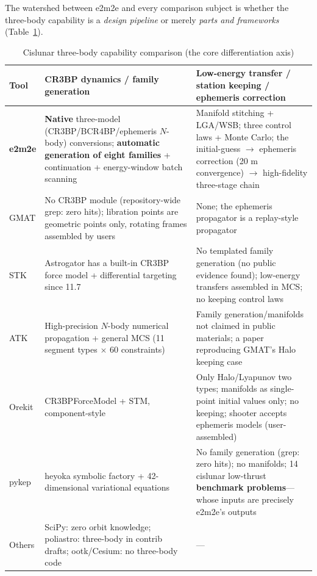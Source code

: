 The watershed between e2m2e and every comparison subject is whether the
three-body capability is a \emph{design pipeline} or merely \emph{parts and
frameworks} (Table~\ref{tab:threebody}).

\begin{table}[htbp]
\centering\small
\caption{Cislunar three-body capability comparison (the core differentiation
axis)}
\label{tab:threebody}
\begin{tabularx}{\textwidth}{@{}lXX@{}}
\toprule
\textbf{Tool} & \textbf{CR3BP dynamics / family generation} &
\textbf{Low-energy transfer / station keeping / ephemeris correction} \\
\midrule
\textbf{e2m2e} & \textbf{Native} three-model (CR3BP/BCR4BP/ephemeris
$N$-body) conversions; \textbf{automatic generation of eight families} +
continuation + energy-window batch scanning & Manifold stitching + LGA/WSB;
three control laws + Monte Carlo; the initial-guess $\to$ ephemeris
correction (20 m convergence) $\to$ high-fidelity three-stage chain \\
GMAT & No CR3BP module (repository-wide grep: zero hits); libration points
are geometric points only, rotating frames assembled by users & None; the
ephemeris propagator is a replay-style propagator \\
STK & Astrogator has a built-in CR3BP force model + differential targeting
since 11.7 & No templated family generation (no public evidence found);
low-energy transfers assembled in MCS; no keeping control laws \\
ATK & High-precision $N$-body numerical propagation + general MCS (11
segment types $\times$ 60 constraints) & Family generation/manifolds not
claimed in public materials; a paper reproducing GMAT's Halo keeping case \\
Orekit & CR3BPForceModel + STM, component-style & Only Halo/Lyapunov two
types; manifolds as single-point initial values only; no keeping; shooter
accepts ephemeris models (user-assembled) \\
pykep & heyoka symbolic factory + 42-dimensional variational equations & No
family generation (grep: zero hits); no manifolds; 14 cislunar low-thrust
\textbf{benchmark problems}---whose inputs are precisely e2m2e's outputs \\
Others & SciPy: zero orbit knowledge; poliastro: three-body in contrib
drafts; ootk/Cesium: no three-body code & --- \\
\bottomrule
\end{tabularx}
\end{table}

